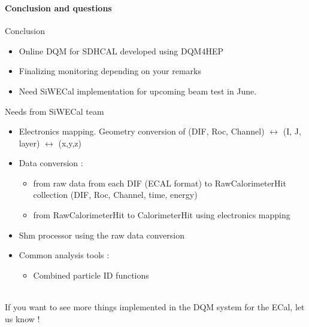 \documentclass[8pt]{beamer}
\begin{document}
  
  \begin{frame}[containsverbatim]
    \frametitle{\secname}
    \framesubtitle{Conclusion and questions}
    \begin{block}{Conclusion}
      \begin{itemize}
        \item Online DQM for SDHCAL developed using DQM4HEP
        \item Finalizing monitoring depending on your remarks
        \item Need SiWECal implementation for upcoming beam test in June.
      \end{itemize}
    \end{block}
    \begin{block}{Needs from SiWECal team}
      \begin{itemize}
        \item Electronics mapping. Geometry conversion of (DIF, Roc, Channel) $\leftrightarrow$ (I, J, layer) $\leftrightarrow$ (x,y,z)
        \item Data conversion :
        \begin{itemize}
          \item from raw data from each DIF (ECAL format) to RawCalorimeterHit collection (DIF, Roc, Channel, time, energy)
          \item from RawCalorimeterHit to CalorimeterHit using electronics mapping
        \end{itemize}
        \item Shm processor using the raw data conversion
        \item Common analysis tools :
        \begin{itemize}
          \item Combined particle ID functions
        \end{itemize}
      \end{itemize}
      ~ \\
      If you want to see more things implemented in the DQM system for the ECal, let us know !
      
    \end{block}
  \end{frame}
  
\end{document}
